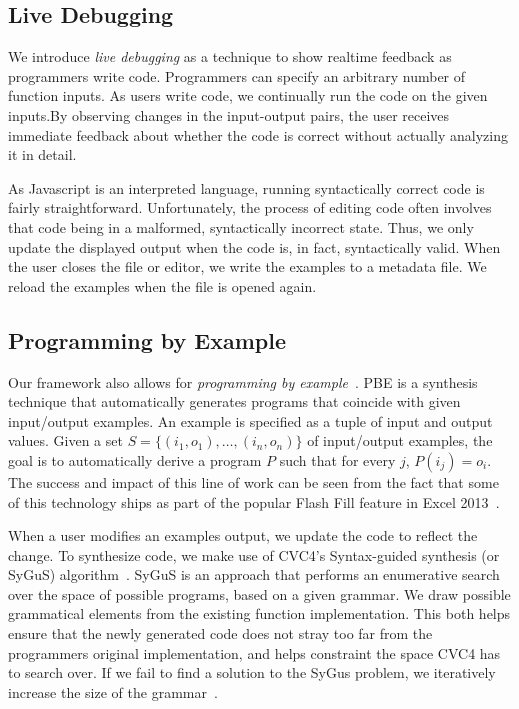 \subsection{Live Debugging}
We introduce \textit{live debugging} as a technique to show realtime feedback as programmers write code.
Programmers can specify an arbitrary number of function inputs.
As users write code, we continually run the code on the given inputs.By observing changes in the input-output pairs,
the user receives immediate feedback about whether the code is correct without actually analyzing it in detail.

As Javascript is an interpreted language, running syntactically correct code is fairly straightforward.
Unfortunately, the process of editing code often involves that code
being in a malformed, syntactically incorrect state.
Thus, we only update the displayed output when the code is, in fact,
syntactically valid.
When the user closes the file or editor,
we write the examples to a metadata file.
We reload the examples when the file is opened again.

\subsection{Programming by Example}
Our framework also allows for \textit{programming by example}~\cite{cypher93,lieberman01,synasc12}.
PBE  is a synthesis technique that automatically generates programs that coincide with given input/output examples. An example is specified as a tuple of input and output values. Given a set $S= \{(i_1, o_1),\ldots, (i_n, o_n)\}$ of input/output examples, the goal is to automatically derive a program $P$ such that for every $j$, $P(i_j) = o_i$. The success and impact of this line of work can be seen from the fact that some of this technology ships as part of the popular Flash Fill feature in Excel 2013~\cite{flashFillPOPL}.

When a user modifies an examples output, we update the code to reflect the change.
To synthesize code, we make use of CVC4's Syntax-guided synthesis (or SyGuS) algorithm~\cite{reynolds2017sygus}.
SyGuS is an approach that performs an enumerative search over the space of possible programs,
based on a given grammar.
We draw possible grammatical elements from the existing function implementation.
This both helps ensure that the newly generated code does not stray too far from the programmers original implementation,
and helps constraint the space CVC4 has to search over.
If we fail to find a solution to the SyGus problem, we iteratively increase the size of the grammar~.


